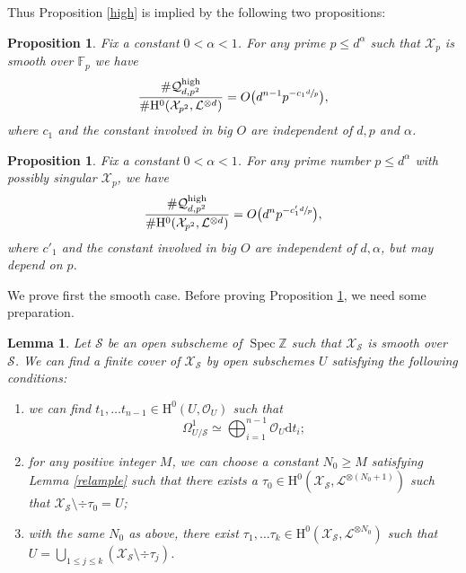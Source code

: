 \documentclass[JEP,XML,SOM,Unicode,published]{cedram}
\theoremstyle{plain}
\newtheorem{lem}[thm]{Lemma}
\newtheorem{prop}[thm]{Proposition}
\theoremstyle{definition}
\newcommand{\ho}{\mathrm{H}}
\newcommand{\X}{\mathcal{X}}
\newcommand{\li}{\mathcal{L}}
\newcommand{\Z}{\mathbb{Z}}
\newcommand{\F}{\mathbb{F}}
\DeclareMathOperator{\Spec}{Spec}
\begin{document}
Thus Proposition \ref{high} is implied by the following two propositions:

\begin{prop}\label{hism}
Fix a constant $0<\alpha<1$. For any prime $p\leq d^{\alpha}$ such that $\X_p$ is smooth over $\F_p$ we have
\[
\frac{\#\mathcal{Q}_{d,p^2}^{\mathrm{high}}}{\#\ho^0(\X_{p^2}, \li^{\otimes d})}=O\bigl(d^{n-1}p^{-c_1\sfrac{d}{p}} \bigr),
\]
where $c_1$ and the constant involved in big $O$ are independent of $d,p$ and $\alpha$.
\end{prop}

\begin{prop}\label{hising}
Fix a constant $0<\alpha<1$. For any prime number $p\leq d^{\alpha}$ with possibly singular $\X_p$, we have
\[
\frac{\#\mathcal{Q}_{d,p^2}^{\mathrm{high}}}{\#\ho^0(\X_{p^2}, \li^{\otimes d})}=O\bigl(d^{n}p^{-c'_1\sfrac{d}{p}} \bigr),
\]
where $c'_1$ and the constant involved in big $O$ are independent of $d,\alpha$, but may depend on $p$.
\end{prop}

We prove first the smooth case. Before proving Proposition \ref{hism}, we need some preparation.
\begin{lem}\label{opensub}
Let $\mathcal{S}$ be an open subscheme of $\Spec \Z$ such that $\X_{\mathcal{S}}$ is smooth over~$\mathcal{S}$. We can find a finite cover of $\X_{\mathcal{S}}$ by open subschemes $U$ satisfying the following conditions:
\begin{enumerate}
\item\label{opensub1} we can find $t_{1},\dots t_{n-1}\in \ho^0(U, \mathcal{O}_{U})$ such that
\[
\Omega_{U/\mathcal{S}}^1\simeq \bigoplus_{i=1}^{n-1} \mathcal{O}_{U}\mathrm{d} t_{i};
\]
\item\label{opensub2} for any positive integer $M$, we can choose a constant $N_0\geq M$ satisfying Lemma \ref{relample} such that there exists a $\tau_0 \in \ho^0(\X_{\mathcal{S}}, \li^{\otimes(N_0+1)})$ such that $\X_{\mathcal{S}}\setminus\div \tau_0=U$;
\item\label{opensub3} with the same $N_0$ as above, there exist $\tau_{1},\dots \tau_{k}\in \ho^0(\X_{\mathcal{S}}, \li^{\otimes N_0})$ such that $U=\bigcup_{1\leq j\leq k}(\X_{\mathcal{S}}\setminus \div \tau_{j})$.
\end{enumerate}
\end{lem}
\end{document}
